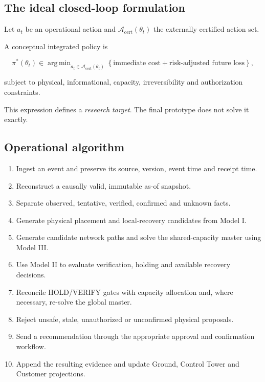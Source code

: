 \documentclass[10pt,a4paper]{article}
\DeclareMathOperator{\argmin}{arg\,min}
\theoremstyle{plain}
\theoremstyle{definition}
\theoremstyle{remark}
\begin{document}
\subsection{The ideal closed-loop formulation}

Let \(a_t\) be an operational action
and \(\mathcal A_{\mathrm{cert}}(\theta_t)\)
the externally certified action set.

A conceptual integrated policy is

\begin{equation}
\pi^*(\theta_t)
\in
\argmin_{a_t\in
\mathcal A_{\mathrm{cert}}(\theta_t)}
\left\{
\text{immediate cost}
+
\text{risk-adjusted future loss}
\right\},
\label{eq:integrated-policy}
\end{equation}

subject to physical, informational,
capacity, irreversibility
and authorization constraints.

This expression defines a
\emph{research target}.
The final prototype
does not solve it exactly.

\subsection{Operational algorithm}

\begin{enumerate}[
  label=\textbf{Step \arabic*.},
  leftmargin=22pt,
  itemsep=3pt
]

\item
Ingest an event and preserve its
source, version, event time and receipt time.

\item
Reconstruct a causally valid,
immutable as-of snapshot.

\item
Separate observed,
tentative, verified,
confirmed and unknown facts.

\item
Generate physical placement and
local-recovery candidates from Model I.

\item
Generate candidate network paths
and solve the shared-capacity master
using Model III.

\item
Use Model II to evaluate
verification, holding and
available recovery decisions.

\item
Reconcile HOLD/VERIFY gates with
capacity allocation and, where necessary,
re-solve the global master.

\item
Reject unsafe, stale,
unauthorized or unconfirmed
physical proposals.

\item
Send a recommendation through the
appropriate approval and confirmation workflow.

\item
Append the resulting evidence and update
Ground, Control Tower and Customer projections.

\end{enumerate}
\end{document}
